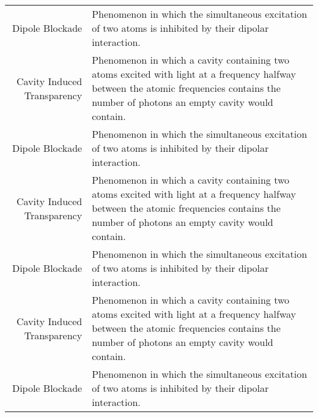 \begin{center}
\begin{longtable}{r p{}}
        Dipole Blockade             & Phenomenon in which the simultaneous excitation of two atoms is inhibited by their dipolar interaction.                                                                                  \\
        Cavity Induced Transparency & Phenomenon in which a cavity containing two atoms excited with light at a frequency halfway between the atomic frequencies contains the number of photons an empty cavity would contain. \\
        Dipole Blockade             & Phenomenon in which the simultaneous excitation of two atoms is inhibited by their dipolar interaction.                                                                                  \\
        Cavity Induced Transparency & Phenomenon in which a cavity containing two atoms excited with light at a frequency halfway between the atomic frequencies contains the number of photons an empty cavity would contain. \\
        Dipole Blockade             & Phenomenon in which the simultaneous excitation of two atoms is inhibited by their dipolar interaction.                                                                                  \\
        Cavity Induced Transparency & Phenomenon in which a cavity containing two atoms excited with light at a frequency halfway between the atomic frequencies contains the number of photons an empty cavity would contain. \\
        Dipole Blockade             & Phenomenon in which the simultaneous excitation of two atoms is inhibited by their dipolar interaction.
    \end{longtable}
\end{center}

